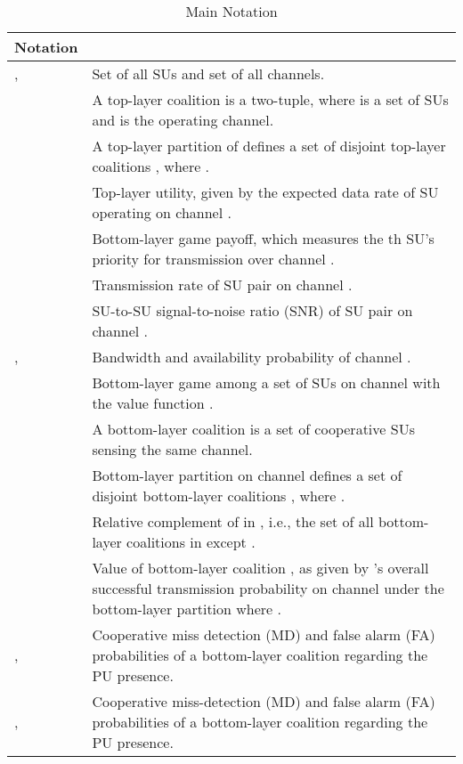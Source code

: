 \documentclass[journal,draftclsnofoot,onecolumn]{IEEEtran}
\theoremstyle{definition}
\newif\ifdoublecolumn
\def\TableOneShortWidth{0.61in}
\def\TableOneLongWidth{2.56in}
\def\Extra{0.5ex}
\def\TableOneShortWidth{0.7in}
\def\TableOneLongWidth{5.4in}
\def\Extra{0.5ex}
\begin{document}
\begin{table}[t]
\caption{Main Notation}  
\label{Table:Notation} 
\centering 
\begin{tabular}{@{\extracolsep{-\Extra}}|>{\centering\arraybackslash}m{\TableOneShortWidth}|>{\arraybackslash}m{\TableOneLongWidth}|}
\hline\hline 
\textbf{Notation} & \multicolumn{1}{c|}{\textbf{Explanation}}\\
\hline\hline
,  &  Set of all SUs and set of all channels. \\
\hline
 & {A top-layer coalition  is a two-tuple, where  is a set of SUs and  is the operating channel. } \\ 
\hline
 &  {A top-layer partition of  defines a set of disjoint top-layer coalitions , where .}\\
\hline
 & {Top-layer utility, given by the expected data rate of SU  operating on channel .}\\
\hline
 & {Bottom-layer game payoff, which measures the th SU's priority for transmission over channel .}\\
\hline
 & {Transmission rate of SU pair  on channel .}\\ 
\hline
 & {SU-to-SU signal-to-noise ratio (SNR) of SU pair  on channel .}\\
\hline
{, } & {Bandwidth and availability probability of channel .}\\
\hline
 & {Bottom-layer game among a set of SUs  on channel  with the value function .} \\
\hline
 & {A bottom-layer coalition  is a set of cooperative SUs sensing the same channel}. \\
\hline
 & {Bottom-layer partition on channel  defines a set of disjoint bottom-layer coalitions , where .} \\
\hline
 & Relative complement of  in , i.e., the set of all bottom-layer coalitions in  except . \\
\hline
 & Value of bottom-layer coalition , as given by 's overall successful transmission probability on channel  under the bottom-layer partition  where . \\
\hline
\ifdoublecolumn
,\vspace{0.5ex}\newline \vspace{0.5ex}  & {Cooperative miss detection (MD) and false alarm (FA) probabilities of a bottom-layer coalition  regarding the PU presence.} \\
\else
, & {Cooperative miss-detection (MD) and false alarm (FA) probabilities of a bottom-layer coalition  regarding the PU presence.} \\

\end{tabular}
\end{table}
\end{document}
